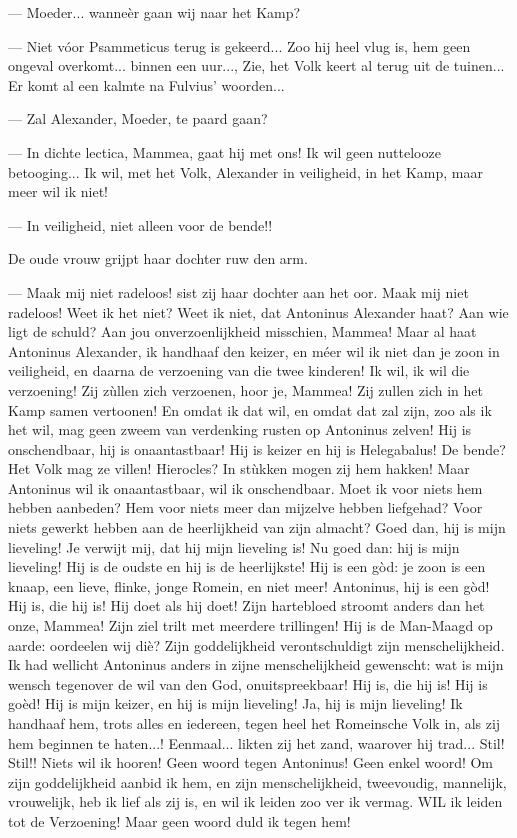 \documentclass[a4paper, 12pt, oneside, dutch]{article}
\begin{document}
--- Moeder... wanneèr gaan wij naar het Kamp?

--- Niet vóor Psammeticus terug is gekeerd... Zoo hij heel vlug is, hem geen ongeval overkomt... binnen een uur..., Zie, het Volk keert al terug uit de tuinen... Er komt al een kalmte na Fulvius' woorden...

--- Zal Alexander, Moeder, te paard gaan?

--- In dichte lectica, Mammea, gaat hij met ons! Ik wil geen nuttelooze betooging... Ik wil, met het Volk, Alexander in veiligheid, in het Kamp, maar meer wil ik niet!

--- In veiligheid, niet alleen voor de bende!!

De oude vrouw grijpt haar dochter ruw den arm.

--- Maak mij niet radeloos! sist zij haar dochter aan het oor. Maak mij niet radeloos! Weet ik het niet? Weet ik niet, dat Antoninus Alexander haat? Aan wie ligt de schuld? Aan jou onverzoenlijkheid misschien, Mammea! Maar al haat Antoninus Alexander, ik handhaaf den keizer, en méer wil ik niet dan je zoon in veiligheid, en daarna de verzoening van die twee kinderen! Ik wil, ik wil die verzoening! Zij zùllen zich verzoenen, hoor je, Mammea! Zij zullen zich in het Kamp samen vertoonen! En omdat ik dat wil, en omdat dat zal zijn, zoo als ik het wil, mag geen zweem van verdenking rusten op Antoninus zelven! Hij is onschendbaar, hij is onaantastbaar! Hij is keizer en hij is Helegabalus! De bende? Het Volk mag ze villen! Hierocles? In stùkken mogen zij hem hakken! Maar Antoninus wil ik onaantastbaar, wil ik onschendbaar. Moet ik voor niets hem hebben aanbeden? Hem voor niets meer dan mijzelve hebben liefgehad? Voor niets gewerkt hebben aan de heerlijkheid van zijn almacht? Goed dan, hij is mijn lieveling! Je verwijt mij, dat hij mijn lieveling is! Nu goed dan: hij is mijn lieveling! Hij is de oudste en hij is de heerlijkste! Hij is een gòd: je zoon is een knaap, een lieve, flinke, jonge Romein, en niet meer! Antoninus, hij is een gòd! Hij is, die hij is! Hij doet als hij doet! Zijn hartebloed stroomt anders dan het onze, Mammea! Zijn ziel trilt met meerdere trillingen! Hij is de Man-Maagd op aarde: oordeelen wij diè? Zijn goddelijkheid verontschuldigt zijn menschelijkheid. Ik had wellicht Antoninus anders in zijne menschelijkheid gewenscht: wat is mijn wensch tegenover de wil van den God, onuitspreekbaar! Hij is, die hij is! Hij is goèd! Hij is mijn keizer, en hij is mijn lieveling! Ja, hij is mijn lieveling! Ik handhaaf hem, trots alles en iedereen, tegen heel het Romeinsche Volk in, als zij hem beginnen te haten...! Eenmaal... likten zij het zand, waarover hij trad... Stil! Stil!! Niets wil ik hooren! Geen woord tegen Antoninus! Geen enkel woord! Om zijn goddelijkheid aanbid ik hem, en zijn menschelijkheid, tweevoudig, mannelijk, vrouwelijk, heb ik lief als zij is, en wil ik leiden zoo ver ik vermag. WIL ik leiden tot de Verzoening! Maar geen woord duld ik tegen hem!
\end{document}
